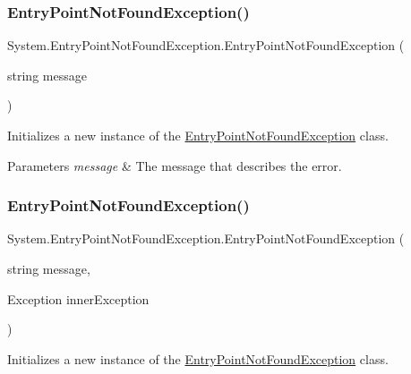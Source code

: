 \subsubsection{\texorpdfstring{EntryPointNotFoundException()}{EntryPointNotFoundException()}\hspace{0.1cm}{\footnotesize\ttfamily [2/3]}}
{\footnotesize\ttfamily System.\+Entry\+Point\+Not\+Found\+Exception.\+Entry\+Point\+Not\+Found\+Exception (\begin{DoxyParamCaption}\item[{string}]{message }\end{DoxyParamCaption})}



Initializes a new instance of the \mbox{\hyperlink{class_system_1_1_entry_point_not_found_exception}{Entry\+Point\+Not\+Found\+Exception}} class. 


\begin{DoxyParams}{Parameters}
{\em message} & The message that describes the error.\\
\hline
\end{DoxyParams}
\mbox{\label{class_system_1_1_entry_point_not_found_exception_a2b5bb2820c3b5123fb1846ac390bdc2a}} 
\subsubsection{\texorpdfstring{EntryPointNotFoundException()}{EntryPointNotFoundException()}\hspace{0.1cm}{\footnotesize\ttfamily [3/3]}}
{\footnotesize\ttfamily System.\+Entry\+Point\+Not\+Found\+Exception.\+Entry\+Point\+Not\+Found\+Exception (\begin{DoxyParamCaption}\item[{string}]{message,  }\item[{Exception}]{inner\+Exception }\end{DoxyParamCaption})}



Initializes a new instance of the \mbox{\hyperlink{class_system_1_1_entry_point_not_found_exception}{Entry\+Point\+Not\+Found\+Exception}} class. 


